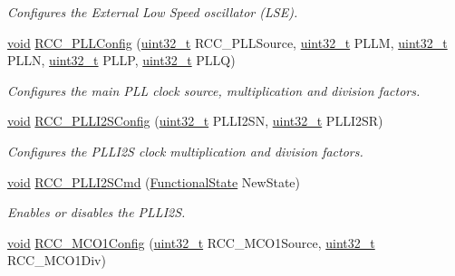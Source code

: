 \begin{DoxyCompactItemize}
\begin{DoxyCompactList}\small\item\em Configures the External Low Speed oscillator (L\-S\-E). \end{DoxyCompactList}\item 
\hyperlink{group___n_a_m_e_ga18028b8badbf1ea7e704ccac3c488e82}{void} \hyperlink{group___r_c_c___group1_ga154b93e90bfdede2a874244a1ff1002e}{R\-C\-C\-\_\-\-P\-L\-L\-Config} (\hyperlink{stdint_8h_a435d1572bf3f880d55459d9805097f62}{uint32\-\_\-t} R\-C\-C\-\_\-\-P\-L\-L\-Source, \hyperlink{stdint_8h_a435d1572bf3f880d55459d9805097f62}{uint32\-\_\-t} P\-L\-L\-M, \hyperlink{stdint_8h_a435d1572bf3f880d55459d9805097f62}{uint32\-\_\-t} P\-L\-L\-N, \hyperlink{stdint_8h_a435d1572bf3f880d55459d9805097f62}{uint32\-\_\-t} P\-L\-L\-P, \hyperlink{stdint_8h_a435d1572bf3f880d55459d9805097f62}{uint32\-\_\-t} P\-L\-L\-Q)
\begin{DoxyCompactList}\small\item\em Configures the main P\-L\-L clock source, multiplication and division factors. \end{DoxyCompactList}\item 
\hyperlink{group___n_a_m_e_ga18028b8badbf1ea7e704ccac3c488e82}{void} \hyperlink{group___r_c_c___group1_ga4c15157382939a693c15620a4867e6ad}{R\-C\-C\-\_\-\-P\-L\-L\-I2\-S\-Config} (\hyperlink{stdint_8h_a435d1572bf3f880d55459d9805097f62}{uint32\-\_\-t} P\-L\-L\-I2\-S\-N, \hyperlink{stdint_8h_a435d1572bf3f880d55459d9805097f62}{uint32\-\_\-t} P\-L\-L\-I2\-S\-R)
\begin{DoxyCompactList}\small\item\em Configures the P\-L\-L\-I2\-S clock multiplication and division factors. \end{DoxyCompactList}\item 
\hyperlink{group___n_a_m_e_ga18028b8badbf1ea7e704ccac3c488e82}{void} \hyperlink{group___r_c_c___group1_ga2efe493a6337d5e0034bfcdfb0f541e4}{R\-C\-C\-\_\-\-P\-L\-L\-I2\-S\-Cmd} (\hyperlink{group___exported__types_gac9a7e9a35d2513ec15c3b537aaa4fba1}{Functional\-State} New\-State)
\begin{DoxyCompactList}\small\item\em Enables or disables the P\-L\-L\-I2\-S. \end{DoxyCompactList}\item 
\hyperlink{group___n_a_m_e_ga18028b8badbf1ea7e704ccac3c488e82}{void} \hyperlink{group___r_c_c___group1_ga15c9ecb6ef015ed008cb28e5b7a50531}{R\-C\-C\-\_\-\-M\-C\-O1\-Config} (\hyperlink{stdint_8h_a435d1572bf3f880d55459d9805097f62}{uint32\-\_\-t} R\-C\-C\-\_\-\-M\-C\-O1\-Source, \hyperlink{stdint_8h_a435d1572bf3f880d55459d9805097f62}{uint32\-\_\-t} R\-C\-C\-\_\-\-M\-C\-O1\-Div)

\end{DoxyCompactItemize}
